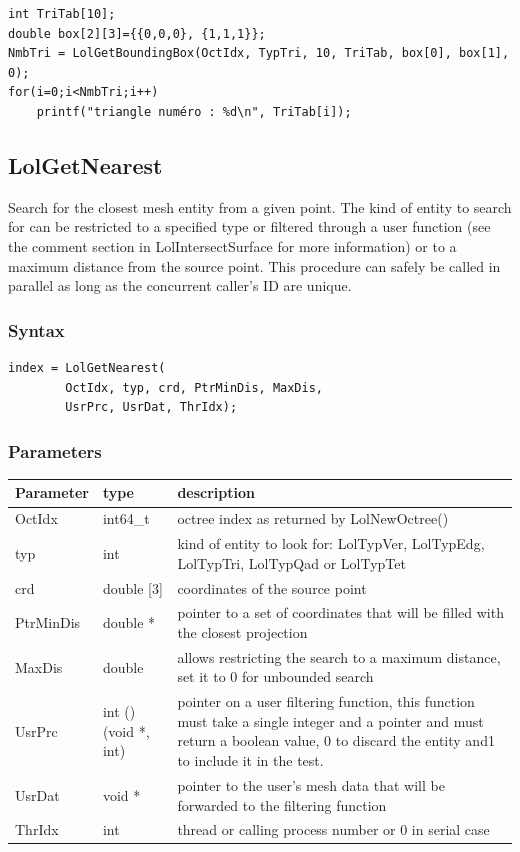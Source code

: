 \documentclass[a4paper,12pt]{article}
\begin{document}
\begin{tt}
\begin{verbatim}
int TriTab[10];
double box[2][3]={{0,0,0}, {1,1,1}};
NmbTri = LolGetBoundingBox(OctIdx, TypTri, 10, TriTab, box[0], box[1], 0);
for(i=0;i<NmbTri;i++)
    printf("triangle numéro : %d\n", TriTab[i]);
\end{verbatim}
\end{tt}
\normalfont


\subsection{LolGetNearest}
Search for the closest mesh entity from a given point. The kind of entity to search for can be restricted to a specified type or filtered through a user function (see the comment section in LolIntersectSurface for more information) or to a maximum distance from the source point. This procedure can safely be called in parallel as long as the concurrent caller's ID are unique.

\subsubsection*{Syntax}
\begin{tt}
\begin{verbatim}
index = LolGetNearest(
        OctIdx, typ, crd, PtrMinDis, MaxDis,
        UsrPrc, UsrDat, ThrIdx);
\end{verbatim}
\end{tt}
\normalfont

\subsubsection*{Parameters}
\begin{tabular}{|m{3cm}|m{2cm}|m{8.5cm}|}
\hline
Parameter  & type       & description \\
\hline
OctIdx     & int64\_t   & octree index as returned by LolNewOctree() \\
\hline
typ        & int        & kind of entity to look for: LolTypVer, LolTypEdg, LolTypTri, LolTypQad or LolTypTet \\
\hline
crd        & double [3] & coordinates of the source point \\
\hline
PtrMinDis  & double *   & pointer to a set of coordinates that will be filled with the closest projection \\
\hline
MaxDis     & double     & allows restricting the search to a maximum distance, set it to 0 for unbounded search \\
\hline
UsrPrc     & int ()(void *, int) & pointer on a user filtering function, this function must take a single integer and a pointer and must return a boolean value, 0 to discard the entity and1 to include it in the test. \\
\hline
UsrDat     & void *    & pointer to the user's mesh data that will be forwarded to the filtering function \\
\hline
ThrIdx     & int       & thread or calling process number or 0 in serial case \\
\hline
\end{tabular}
\end{document}
